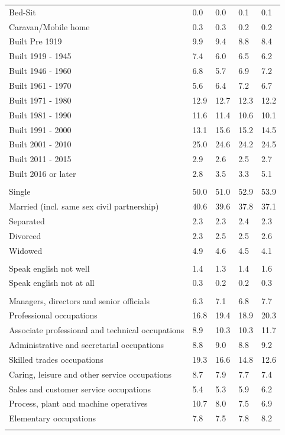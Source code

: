 \documentclass{article}
\begin{document}
\begin{table}[h]
\begin{tabular}{KTTTT}
Bed-Sit & 0.0& 0.0& 0.1& 0.1\\
Caravan/Mobile home & 0.3& 0.3& 0.2& 0.2\\
    \hline
Built Pre 1919 & 9.9& 9.4& 8.8& 8.4\\
Built 1919 - 1945 & 7.4& 6.0& 6.5& 6.2\\
Built  1946 - 1960 & 6.8& 5.7& 6.9& 7.2\\
Built  1961 - 1970 & 5.6& 6.4& 7.2& 6.7\\
Built  1971 - 1980 & 12.9& 12.7& 12.3& 12.2\\
Built  1981 - 1990 & 11.6& 11.4& 10.6& 10.1\\
Built  1991 - 2000 & 13.1& 15.6& 15.2& 14.5\\
Built  2001 - 2010 & 25.0& 24.6& 24.2& 24.5\\
Built  2011 - 2015 & 2.9& 2.6& 2.5& 2.7\\
Built  2016 or later & 2.8& 3.5& 3.3& 5.1\\
\hline
    \\
    \hline
Single & 50.0& 51.0& 52.9& 53.9\\
Married (incl. same sex civil partnership) & 40.6& 39.6& 37.8& 37.1\\
Separated  & 2.3& 2.3& 2.4& 2.3\\
Divorced  & 2.3& 2.5& 2.5& 2.6\\
Widowed & 4.9& 4.6& 4.5& 4.1\\
\hline
    \\ 
    \hline
Speak english not well & 1.4& 1.3& 1.4& 1.6\\
Speak english not at all & 0.3& 0.2& 0.2& 0.3\\
\hline
    \\
    \hline
Managers, directors and senior officials & 6.3& 7.1& 6.8& 7.7\\
Professional occupations & 16.8& 19.4& 18.9& 20.3\\
Associate professional and technical occupations &  8.9& 10.3& 10.3& 11.7\\
Administrative and secretarial occupations & 8.8& 9.0& 8.8& 9.2\\
Skilled trades occupations & 19.3& 16.6& 14.8& 12.6\\
Caring, leisure and other service occupations & 8.7& 7.9& 7.7& 7.4\\
Sales and customer service occupations & 5.4& 5.3& 5.9& 6.2\\
Process, plant and machine operatives & 10.7&  8.0&  7.5&  6.9\\
Elementary occupations & 7.8& 7.5& 7.8& 8.2\\
\hline
\end{tabular}
\end{table}
\end{document}
